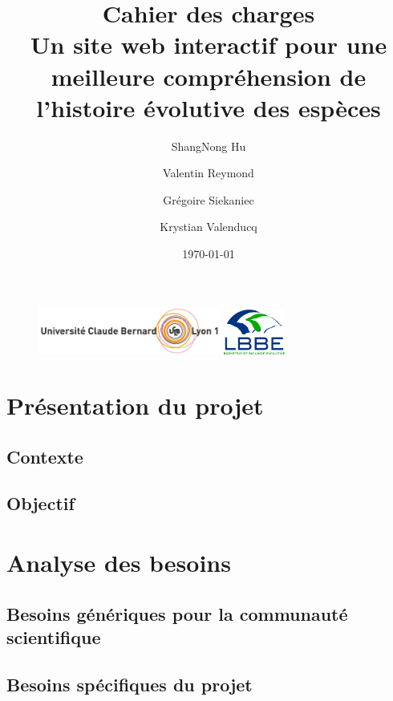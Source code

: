 \documentclass[a4paper]{article}
\title{{\sc \large Cahier des charges}\\
\bf Un site web interactif pour une meilleure compréhension de l’histoire évolutive des espèces}
\author{ShangNong {\sc Hu}\and Valentin {\sc Reymond}\and Grégoire {\sc Siekaniec}\and Krystian {\sc Valenducq}}
\date\today
\begin{document}
\begin{figure}[!t]
	\centering
	\includegraphics[width=6cm]{ucbl.png}
	\hspace{\fill}
	\includegraphics[width=2cm]{lbbe.png}
\end{figure}

\maketitle
\thispagestyle{empty}
\newpage

\tableofcontents
\newpage


\section{Présentation du projet}
	
	\subsection{Contexte}

		

	\subsection{Objectif}			


\section{Analyse des besoins}

	\subsection{Besoins génériques pour la communauté scientifique}

		

	\subsection{Besoins spécifiques du projet}

		
\end{document}
